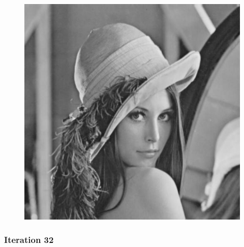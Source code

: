 \documentclass[11pt]{article}
\makeatletter
\def\maxwidth{\ifdim\Gin@nat@width>\linewidth\linewidth
    \else\Gin@nat@width\fi}
\let\Oldincludegraphics\includegraphics
\renewcommand{\includegraphics}[1]{\Oldincludegraphics[width=.8\maxwidth]{#1}}
\makeatother
\begin{document}
\begin{figure}[!htbp]
	\centering
	\includegraphics{"15th iterations_varying"}
	\label{fig:15th-iterationsvarying}
\end{figure}
\clearpage
    \hypertarget{iteration-32}{%
\subsubsection{Iteration 32}\label{iteration-32}}
\end{document}
